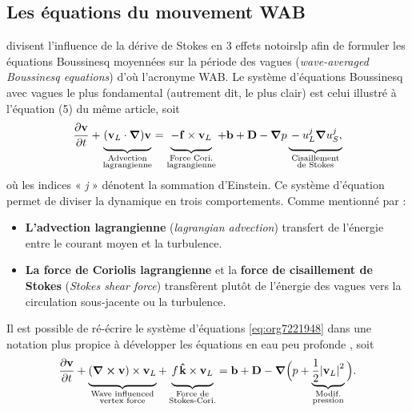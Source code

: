 \documentclass[10pt]{report}
\numberwithin{equation}{section}
\newcommand{\kvf}{\vb{\hat{k}}}
\newcommand{\vv}{\vb{v}}
\newcommand{\grande}{\vphantom{\frac{1}{xx}}}
\newcommand{\pt}{\hspace{1pt}} %
\begin{document}
\subsection{Les équations du mouvement WAB}
\label{sec:org824870d}

\textcite{suzuki2016understanding} divisent l'influence de la dérive de Stokes en 3 effets notoirslp afin de formuler les équations Boussinesq moyennées sur la période des vagues (\emph{wave-averaged Boussinesq equations}) d'où l'acronyme WAB.
Le système d'équations Boussinesq avec vagues le plus fondamental (autrement dit, le plus clair) est celui illustré à l'équation (5) du même article, soit
\begin{equation}
\label{eq:org7221948}
   \pdv{\vv}{t}
   +\underbrace{\qty( \vv_L\cdot\gradient{})\vv\grande}_{\substack{\text{Advection}\\\text{lagrangienne}}}
   = \underbrace{-\grande\vb{f}\times\vv_L}_{\substack{\text{Force Cori.}\\\text{lagrangienne}}}
   +\vb{b} + \vb{D} - \gradient p
   \underbrace{\grande- u_L^j\gradient{u_S^j},}_{\substack{\text{Cisaillement}\\\text{de Stokes}}}
\end{equation}
où les indices « \emph{j} » dénotent la sommation d'Einstein.
Ce système d'équation permet de diviser la dynamique en trois comportements. 
Comme mentionné par  :

\begin{itemize}
\item \textbf{L'advection lagrangienne} (\emph{lagrangian advection}) transfert de l'énergie entre le courant moyen et la turbulence.
\item \textbf{La force de Coriolis lagrangienne} et la \textbf{force de cisaillement de Stokes} (\emph{Stokes shear force}) transfèrent plutôt de l'énergie des vagues vers la circulation sous-jacente ou la turbulence.
\end{itemize}

Il est possible de ré-écrire le système d'équations \ref{eq:org7221948} dans une notation plus propice à développer les équations en eau peu profonde \autocite[Voir][équation 1]{suzuki2016understanding}, soit
\begin{equation}
   \pdv{\vv}{t}
   +\underbrace{\grande\qty(\curl{\vv}) \times \vv_L}_{\substack{\text{Wave influenced}\\ \text{vertex force}}}
   +\underbrace{\grande f\pt\kvf\times \vv_L}_{\substack{\text{Force de}\\\text{Stokes-Cori.}}}
   = \vb{b} + \vb{D} -\gradient{}\Big( p + \underbrace{\frac{1}{2}\abs{\vv_L}^2}_{\substack{\text{Modif.}\\\text{pression}}}\Big).
\end{equation}
\end{document}
